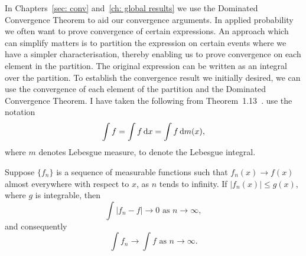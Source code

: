 In Chapters~\ref{sec: conv} and~\ref{ch: global results} we use the Dominated Convergence Theorem to aid our convergence arguments. In applied probability we often want to prove convergence of certain expressions. An approach which can simplify matters is to partition the expression on certain events where we have a simpler characterisation, thereby enabling us to prove convergence on each element in the partition. The original expression can be written as an integral over the partition. To establish the convergence result we initially desired, we can use the convergence of each element of the partition and the Dominated Convergence Theorem. I have taken the following from Theorem~1.13~\cite{steinreal}. \cite{steinreal} use the notation 
\[\int f = \int f \, \mathrm{d} x = \int f \, \mathrm{d} m(x),\]
where \(m\) denotes Lebesgue measure, to denote the Lebesgue integral. 
\begin{thm}
	Suppose \(\{f_n\}\) is a sequence of measurable functions such that \(f_n(x)\to f(x)\) almost everywhere with respect to \(x\), as \(n\) tends to infinity. If \(|f_n(x)|\leq g(x)\), where \(g\) is integrable, then 
	\[\int|f_n-f|\to 0 \mbox{ as } n \to \infty,\]
	and consequently 
	\[\int f_n\to\int f \mbox{ as } n\to \infty.\]
\end{thm}


